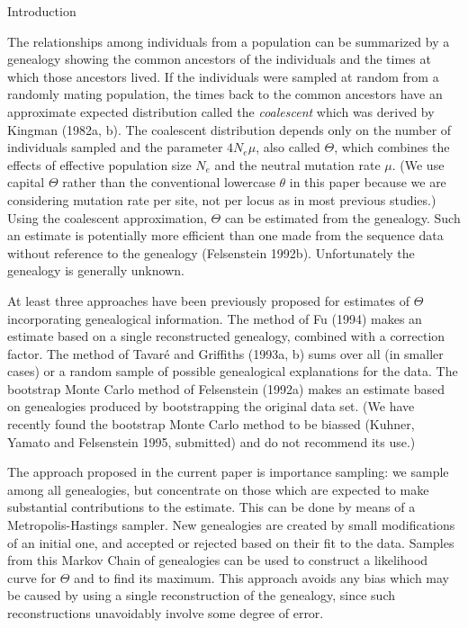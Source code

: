 \bigskip
{\center Introduction}
\bigskip

The relationships among individuals from a population can be summarized
by a genealogy showing the common ancestors of the individuals and the
times at which those ancestors lived.  If the individuals were sampled
at random from a randomly mating population, the times back to the
common ancestors have an approximate expected distribution called the {\it
coalescent} which was derived by Kingman (1982a, b).  The coalescent
distribution depends only on the number of individuals sampled and the
parameter $4N_e\mu$, also called $\Theta$, which combines the effects of 
effective
population size $N_e$ and the neutral mutation rate $\mu$.  (We use
capital $\Theta$ rather than the conventional lowercase $\theta$ in this
paper because we are considering mutation rate per site, not per locus
as in most previous studies.)  Using the coalescent approximation, 
$\Theta$ can be estimated from the genealogy.
Such an estimate is potentially more efficient than one made
from the sequence data without reference to the genealogy (Felsenstein
1992b).
Unfortunately the genealogy is generally unknown.  

At least three approaches have been previously proposed for estimates
of $\Theta$ incorporating genealogical information.
The method of Fu (1994) makes an estimate based on a single 
reconstructed genealogy, combined with a correction factor. 
The method of Tavar\'{e} and Griffiths (1993a, b) sums over all (in
smaller cases) or a random sample of possible genealogical explanations 
for the data.
The bootstrap Monte Carlo method of Felsenstein (1992a) makes an
estimate based on genealogies produced by bootstrapping the original data set.
(We have recently found the bootstrap Monte Carlo method to be biassed
(Kuhner, Yamato and Felsenstein 1995, submitted) and do not recommend its use.)

The approach proposed in the current paper is importance sampling:  we
sample among all
genealogies, but concentrate on those which are expected to make
substantial contributions to the estimate.
This can be done by means of a Metropolis-Hastings sampler.  New
genealogies are created by small modifications of an initial one, and
accepted or rejected based on their fit to the data.  Samples
from this Markov Chain of genealogies can be used to construct a
likelihood curve for $\Theta$ and to find its maximum.  This approach
avoids any bias which may be caused by using a single reconstruction of
the genealogy, since such reconstructions unavoidably involve some
degree of error.


